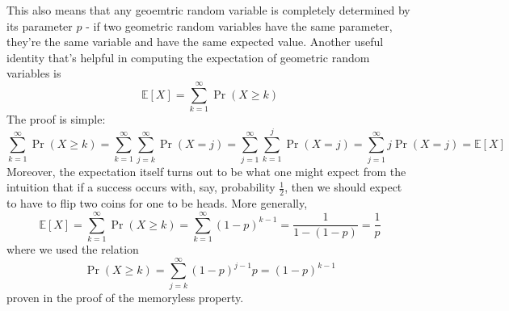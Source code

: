 \documentclass{article}
\newcommand*{\nn}{\newline \newline}
\newcommand*{\E}{\mathbb{E}}
\begin{document}
\qedsymbol
\nn
This also means that any geoemtric random variable is completely determined by its parameter $ p $ - if two geometric random variables have the same parameter, they're the same variable and have the same expected value. Another useful identity that's helpful in computing the expectation of geometric random variables is
$$ \E[X] = \sum_{k = 1}^\infty \Pr(X \geq k) $$
The proof is simple:
$$ \sum_{k = 1}^\infty \Pr(X \geq k) = \sum_{k = 1}^\infty \sum_{j = k}^\infty \Pr(X = j) = \sum_{j = 1}^\infty \sum_{k = 1}^j \Pr(X = j) = \sum_{j = 1}^\infty j \Pr(X = j) = \E[X] $$
Moreover, the expectation itself turns out to be what one might expect from the intuition that if a success occurs with, say, probability $ \frac{1}{2} $, then we should expect to have to flip two coins for one to be heads. More generally,
$$ \E[X] = \sum_{k = 1}^\infty \Pr(X \geq k) = \sum_{k = 1}^\infty (1 - p)^{k - 1} = \frac{1}{1 - (1 - p)} = \frac{1}{p} $$
where we used the relation
$$ \Pr(X \geq k) = \sum_{j = k}^\infty (1 - p)^{j - 1} p = (1 - p)^{k - 1} $$
proven in the proof of the memoryless property.
\end{document}
